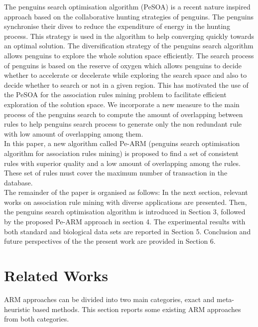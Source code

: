 \documentclass[preprint,12pt]{elsarticle}
\begin{document}
The penguins search optimisation algorithm (PeSOA) \cite{15} is a recent nature inspired approach based on the collaborative hunting strategies of penguins. The penguins synchronise their dives to reduce the expenditure of energy in the hunting process. This strategy is used in the algorithm to help converging quickly towards an optimal solution. The diversification strategy of the penguins search algorithm allows penguins to explore  the whole solution space efficiently. The search process of penguins is based on the reserve of oxygen which allows penguins to decide whether to accelerate or decelerate while exploring the search space and also to decide whether to search or not in a given region. This has motivated the use of the PeSOA for the association rules mining problem to facilitate efficient exploration of the solution space. We incorporate a new measure to the main process of the penguins search to compute the amount of overlapping between rules to help penguins search process to generate only the non redundant rule with low amount of overlapping among them. \\
In this paper, a new algorithm called Pe-ARM (penguins search optimisation algorithm for association rules mining) is proposed  to find a set of consistent rules with superior quality and a low amount of overlapping among the rules. These set of rules must cover the maximum number of transaction in the database.\\
The remainder of the paper is organised as follows: In the next section, relevant works on association rule mining with diverse applications are presented. 
Then, the penguins search optimisation algorithm is introduced in Section 3, 
followed by the proposed Pe-ARM approach   in section 4. 
The experimental results with both standard and biological data sets are reported in Section 5. 
Conclusion and future perspectives of the the present work are provided in Section 6.

\section{Related Works}
ARM approaches can be divided into two main categories, exact and meta-heuristic based methods.
This section reports some existing ARM approaches from both categories.
\end{document}
